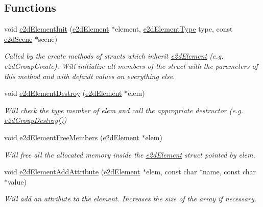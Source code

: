 \subsection*{Functions}
\begin{DoxyCompactItemize}
\item 
void \hyperlink{group__e2d_element_ga8734d10ef40a380dfc51bfe1790a92a7}{e2d\-Element\-Init} (\hyperlink{structe2d_element}{e2d\-Element} $\ast$element, \hyperlink{group__e2d_element_ga9bc8cfdec08c7e9069fc707ee456fd38}{e2d\-Element\-Type} type, const \hyperlink{structe2d_scene}{e2d\-Scene} $\ast$scene)
\begin{DoxyCompactList}\small\item\em Called by the create methods of structs which inherit \hyperlink{structe2d_element}{e2d\-Element} (e.\-g. e2d\-Group\-Create). Will initialize all members of the struct with the parameters of this method and with default values on everything else. \end{DoxyCompactList}\item 
void \hyperlink{group__e2d_element_ga214c437a16fe6f3fc795539f851a2019}{e2d\-Element\-Destroy} (\hyperlink{structe2d_element}{e2d\-Element} $\ast$elem)
\begin{DoxyCompactList}\small\item\em Will check the type member of elem and call the appropriate destructor (e.\-g. \hyperlink{group__e2d_group_ga545626effa0f89b72f244e56aadb05bc}{e2d\-Group\-Destroy()}) \end{DoxyCompactList}\item 
void \hyperlink{group__e2d_element_gae8da5104d70a09549ca74044dda8313c}{e2d\-Element\-Free\-Members} (\hyperlink{structe2d_element}{e2d\-Element} $\ast$elem)
\begin{DoxyCompactList}\small\item\em Will free all the allocated memory inside the \hyperlink{structe2d_element}{e2d\-Element} struct pointed by elem. \end{DoxyCompactList}\item 
void \hyperlink{group__e2d_element_ga5cfa0a343d3dd1a30b0addc4ec6e7f88}{e2d\-Element\-Add\-Attribute} (\hyperlink{structe2d_element}{e2d\-Element} $\ast$elem, const char $\ast$name, const char $\ast$value)
\begin{DoxyCompactList}\small\item\em Will add an attribute to the element. Increases the size of the array if necessary. \end{DoxyCompactList}\item 

\end{DoxyCompactItemize}
